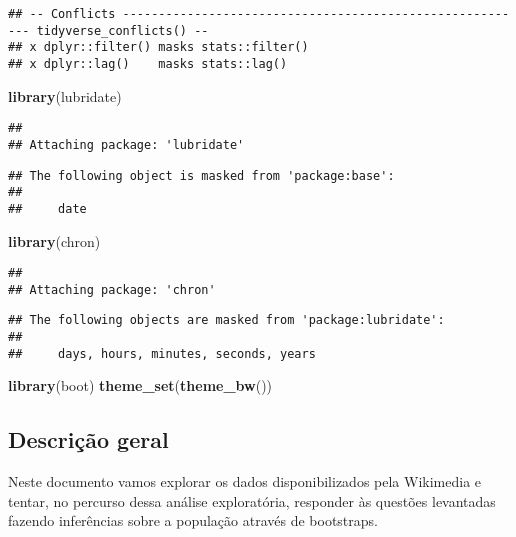 \documentclass[]{article}
\newenvironment{Shaded}{\begin{snugshade}}{\end{snugshade}}
\newcommand{\KeywordTok}[1]{\textcolor[rgb]{0.13,0.29,0.53}{\textbf{#1}}}
\newcommand{\NormalTok}[1]{#1}
\begin{document}
\begin{verbatim}
## -- Conflicts --------------------------------------------------------- tidyverse_conflicts() --
## x dplyr::filter() masks stats::filter()
## x dplyr::lag()    masks stats::lag()
\end{verbatim}

\begin{Shaded}
\begin{Highlighting}[]
\KeywordTok{library}\NormalTok{(lubridate)}
\end{Highlighting}
\end{Shaded}

\begin{verbatim}
## 
## Attaching package: 'lubridate'
\end{verbatim}

\begin{verbatim}
## The following object is masked from 'package:base':
## 
##     date
\end{verbatim}

\begin{Shaded}
\begin{Highlighting}[]
\KeywordTok{library}\NormalTok{(chron)}
\end{Highlighting}
\end{Shaded}

\begin{verbatim}
## 
## Attaching package: 'chron'
\end{verbatim}

\begin{verbatim}
## The following objects are masked from 'package:lubridate':
## 
##     days, hours, minutes, seconds, years
\end{verbatim}

\begin{Shaded}
\begin{Highlighting}[]
\KeywordTok{library}\NormalTok{(boot)}
\KeywordTok{theme_set}\NormalTok{(}\KeywordTok{theme_bw}\NormalTok{())}
\end{Highlighting}
\end{Shaded}

\subsection{Descrição geral}\label{descricao-geral}

Neste documento vamos explorar os dados disponibilizados pela Wikimedia
e tentar, no percurso dessa análise exploratória, responder às questões
levantadas fazendo inferências sobre a população através de bootstraps.
\end{document}

